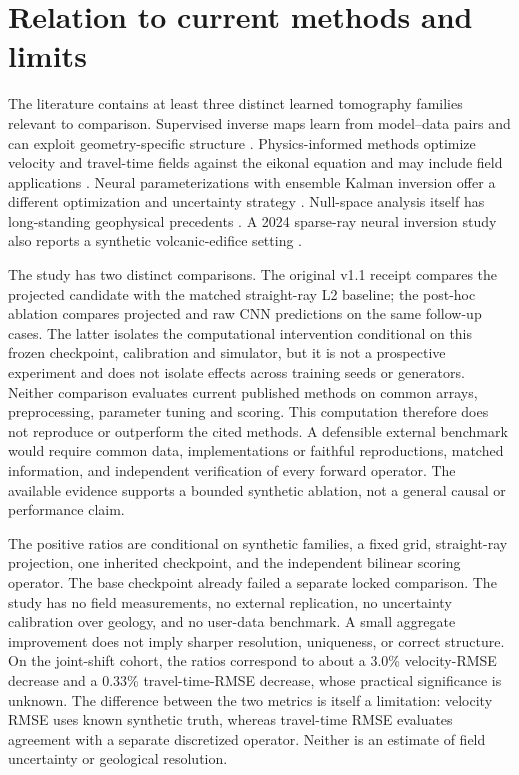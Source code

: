\documentclass[11pt]{article}
\begin{document}
\section{Relation to current methods and limits}
The literature contains at least three distinct learned tomography families relevant to comparison. Supervised inverse maps learn from model--data pairs and can exploit geometry-specific structure \cite{fan_ying_2023}. Physics-informed methods optimize velocity and travel-time fields against the eikonal equation and may include field applications \cite{waheed_2021, song_2025}. Neural parameterizations with ensemble Kalman inversion offer a different optimization and uncertainty strategy \cite{eki_nn_2024}. Null-space analysis itself has long-standing geophysical precedents \cite{pratt_1997,chave_2007}. A 2024 sparse-ray neural inversion study also reports a synthetic volcanic-edifice setting \cite{volcano_ann_2024}.

The study has two distinct comparisons. The original v1.1 receipt compares the projected candidate with the matched straight-ray L2 baseline; the post-hoc ablation compares projected and raw CNN predictions on the same follow-up cases. The latter isolates the computational intervention conditional on this frozen checkpoint, calibration and simulator, but it is not a prospective experiment and does not isolate effects across training seeds or generators. Neither comparison evaluates current published methods on common arrays, preprocessing, parameter tuning and scoring. This computation therefore does not reproduce or outperform the cited methods. A defensible external benchmark would require common data, implementations or faithful reproductions, matched information, and independent verification of every forward operator. The available evidence supports a bounded synthetic ablation, not a general causal or performance claim.

The positive ratios are conditional on synthetic families, a fixed grid, straight-ray projection, one inherited checkpoint, and the independent bilinear scoring operator. The base checkpoint already failed a separate locked comparison. The study has no field measurements, no external replication, no uncertainty calibration over geology, and no user-data benchmark. A small aggregate improvement does not imply sharper resolution, uniqueness, or correct structure. On the joint-shift cohort, the ratios correspond to about a 3.0\% velocity-RMSE decrease and a 0.33\% travel-time-RMSE decrease, whose practical significance is unknown. The difference between the two metrics is itself a limitation: velocity RMSE uses known synthetic truth, whereas travel-time RMSE evaluates agreement with a separate discretized operator. Neither is an estimate of field uncertainty or geological resolution.
\end{document}
